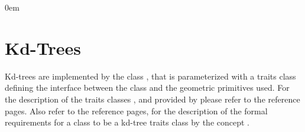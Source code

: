 %



\renewcommand{\Re}{{\rm I\!\hspace{-0.025em} R}}
\newcommand{\new}[1]{\marginpar{\sf #1}}
\newcommand{\kdt}{kd-tree}
\newcommand{\kdts}{kd-trees}
\newcommand{\brc}[1]{\left\{ {#1} \right\}}
\def\Ipe#1{\def\IPEfile{#1}}

\parindent0em
\setlength{\parskip}{1ex minus 0.9ex}
\sloppy

%


\clearpage

\section{Kd-Trees} 
\label{KDT_section}




Kd-trees are implemented by
the class , that is parameterized with a traits class defining
the interface between the class and the geometric primitives used.
For the description of the traits classes ,  
and  provided by {\cgal} please refer to the reference pages.
Also refer to the reference pages, for the description of the formal requirements for a class to be 
a kd-tree traits class by the concept .


